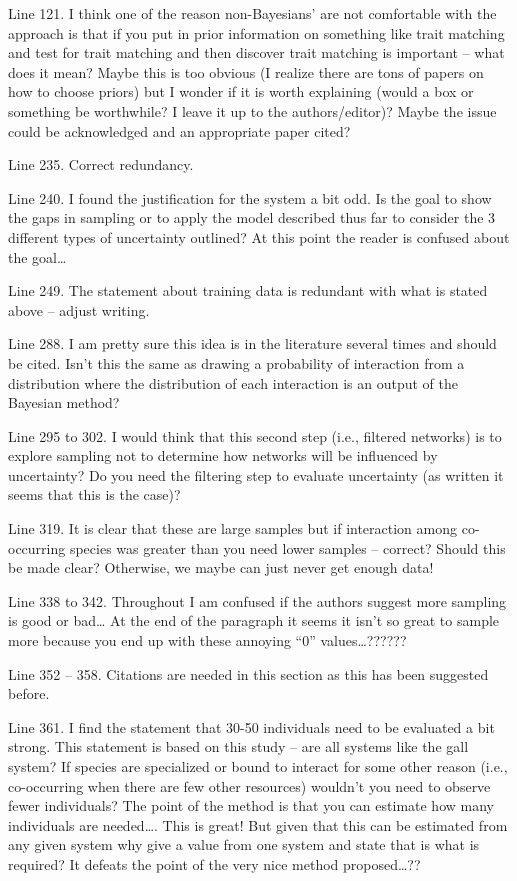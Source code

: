 Line 121.  I think one of the reason non-Bayesians’ are not comfortable with the approach is that if you put in prior information on something like trait matching and test for trait matching and then discover trait matching is important – what does it mean?  Maybe this is too obvious (I realize there are tons of papers on how to choose priors) but I wonder if it is worth explaining (would a box or something be worthwhile?  I leave it up to the authors/editor)?  Maybe the issue could be acknowledged and an appropriate paper cited?

Line 235.  Correct redundancy.

Line 240.  I found the justification for the system a bit odd.  Is the goal to show the gaps in sampling or to apply the model described thus far to consider the 3 different types of uncertainty outlined?  At this point the reader is confused about the goal…

Line 249.  The statement about training data is redundant with what is stated above – adjust writing.

Line 288.  I am pretty sure this idea is in the literature several times and should be cited.  Isn’t this the same as drawing a probability of interaction from a distribution where the distribution of each interaction is an output of the Bayesian method?

Line 295 to 302.  I would think that this second step (i.e., filtered networks) is to explore sampling not to determine how networks will be influenced by uncertainty?  Do you need the filtering step to evaluate uncertainty (as written it seems that this is the case)?

Line 319.  It is clear that these are large samples but if interaction among co-occurring species was greater than you need lower samples – correct?  Should this be made clear?  Otherwise, we maybe can just never get enough data!

Line 338 to 342.  Throughout I am confused if the authors suggest more sampling is good or bad…  At the end of the paragraph it seems it isn’t so great to sample more because you end up with these annoying “0” values…??????

Line 352 – 358.  Citations are needed in this section as this has been suggested before.

Line 361.  I find the statement that 30-50 individuals need to be evaluated a bit strong.  This statement is based on this study – are all systems like the gall system?  If species are specialized or bound to interact for some other reason (i.e., co-occurring when there are few other resources) wouldn’t you need to observe fewer individuals?  The point of the method is that you can estimate how many individuals are needed…. This is great!  But given that this can be estimated from any given system why give a value from one system and state that is what is required?  It defeats the point of the very nice method proposed…??

